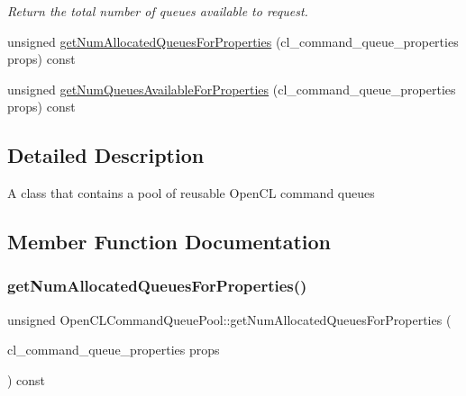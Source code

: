 \begin{DoxyCompactItemize}
\begin{DoxyCompactList}\small\item\em Return the total number of queues available to request. \end{DoxyCompactList}\item 
unsigned \hyperlink{classglow_1_1runtime_1_1_open_c_l_command_queue_pool_a586609f9e0e09548475b65a4a4316872}{get\+Num\+Allocated\+Queues\+For\+Properties} (cl\+\_\+command\+\_\+queue\+\_\+properties props) const
\item 
unsigned \hyperlink{classglow_1_1runtime_1_1_open_c_l_command_queue_pool_a58fe81267fed85fdf99ef443faf9a286}{get\+Num\+Queues\+Available\+For\+Properties} (cl\+\_\+command\+\_\+queue\+\_\+properties props) const
\end{DoxyCompactItemize}


\subsection{Detailed Description}
A class that contains a pool of reusable Open\+CL command queues 

\subsection{Member Function Documentation}
\mbox{\label{classglow_1_1runtime_1_1_open_c_l_command_queue_pool_a586609f9e0e09548475b65a4a4316872}} 
\subsubsection{\texorpdfstring{get\+Num\+Allocated\+Queues\+For\+Properties()}{getNumAllocatedQueuesForProperties()}}
{\footnotesize\ttfamily unsigned Open\+C\+L\+Command\+Queue\+Pool\+::get\+Num\+Allocated\+Queues\+For\+Properties (\begin{DoxyParamCaption}\item[{cl\+\_\+command\+\_\+queue\+\_\+properties}]{props }\end{DoxyParamCaption}) const}

